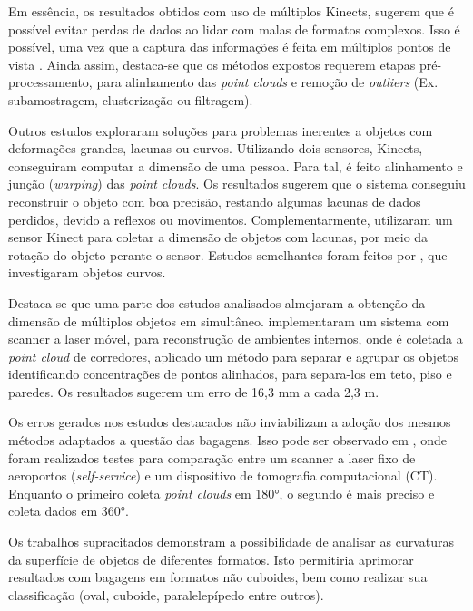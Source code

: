     Em essência, os resultados obtidos com uso de múltiplos Kinects, sugerem que é possível evitar perdas de dados ao lidar com malas de formatos complexos. Isso é possível, uma vez que a captura das informações é feita em múltiplos pontos de vista . Ainda assim, destaca-se que os métodos expostos requerem etapas pré-processamento, para alinhamento das \textit{point clouds} e remoção de \textit{outliers} (Ex. subamostragem, clusterização ou filtragem). 
    
    Outros estudos exploraram soluções para problemas inerentes a objetos com deformações grandes, lacunas ou curvos. Utilizando dois sensores, Kinects,  conseguiram computar a dimensão de uma pessoa. Para tal, é feito alinhamento e junção (\textit{warping}) das \textit{point clouds}. Os resultados sugerem que o sistema conseguiu reconstruir o objeto com boa precisão, restando algumas lacunas de dados perdidos, devido a reflexos ou movimentos. Complementarmente,  utilizaram um sensor Kinect para coletar a dimensão de objetos com lacunas, por meio da rotação do objeto perante o sensor. Estudos semelhantes foram feitos por , que investigaram objetos curvos. 
    
    Destaca-se que uma parte dos estudos analisados almejaram a obtenção da dimensão de múltiplos objetos em simultâneo.  implementaram um sistema com scanner a laser móvel, para reconstrução de ambientes internos, onde é coletada a \textit{point cloud} de corredores, aplicado um método para separar e agrupar os objetos identificando concentrações de pontos alinhados, para separa-los em teto, piso e paredes. Os resultados sugerem um erro de 16,3 mm a cada 2,3 m. 
    
    Os erros gerados nos estudos destacados não inviabilizam a adoção dos mesmos métodos adaptados a questão das bagagens. Isso pode ser observado em , onde foram realizados testes para comparação entre um scanner a laser fixo de aeroportos (\textit{self-service}) e um dispositivo de tomografia computacional (CT). Enquanto o primeiro coleta \textit{point clouds} em 180°, o segundo é mais preciso e coleta dados em 360°. 
    
    Os trabalhos supracitados demonstram a possibilidade de analisar as curvaturas da superfície de objetos de diferentes formatos. Isto permitiria aprimorar resultados com bagagens em formatos não cuboides, bem como realizar sua classificação (oval, cuboide, paralelepípedo entre outros).



